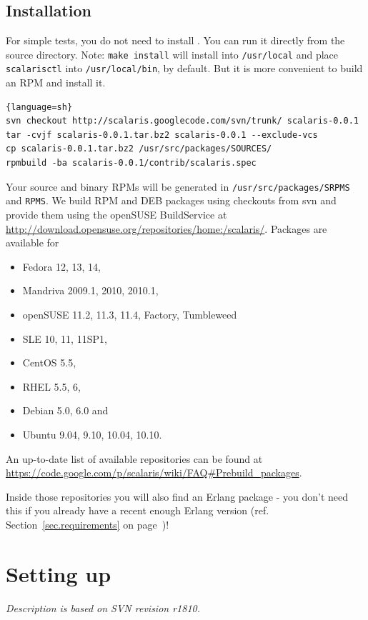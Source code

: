 \documentclass[a4paper]{scrreprt}
\newcommand{\sieheref}[1]{\ref{#1} on page~\pageref{#1}}
\newcommand{\code}[1]{\lstinline[basicstyle=\ttfamily]!#1!}
\newcommand{\svnrev}[1]
{\hfill\emph{Description is based on SVN revision #1.}\medskip}
\begin{document}
\section{Installation}
\label{sec:install}

For simple tests, you do not need to install \scalaris{}. You can run it
directly from the source directory. Note: \code{make install} will install
\scalaris{} into \code{/usr/local} and place \code{scalarisctl} into
\code{/usr/local/bin}, by default. But it is more convenient to build an RPM
and install it.

\begin{lstlisting}{language=sh}
svn checkout http://scalaris.googlecode.com/svn/trunk/ scalaris-0.0.1
tar -cvjf scalaris-0.0.1.tar.bz2 scalaris-0.0.1 --exclude-vcs
cp scalaris-0.0.1.tar.bz2 /usr/src/packages/SOURCES/
rpmbuild -ba scalaris-0.0.1/contrib/scalaris.spec
\end{lstlisting}

Your source and binary RPMs will be generated in
\code{/usr/src/packages/SRPMS} and \code{RPMS}. We build RPM and DEB packages
using checkouts from svn and provide them using the openSUSE BuildService at
\url{http://download.opensuse.org/repositories/home:/scalaris/}. Packages
are available for

\begin{itemize}
\item Fedora 12, 13, 14,
\item Mandriva 2009.1, 2010, 2010.1,
\item openSUSE 11.2, 11.3, 11.4, Factory, Tumbleweed
\item SLE 10, 11, 11SP1,
\item CentOS 5.5,
\item RHEL 5.5, 6,
\item Debian 5.0, 6.0 and
\item Ubuntu 9.04, 9.10, 10.04, 10.10.
\end{itemize}

An up-to-date list of available repositories can be found at
\url{https://code.google.com/p/scalaris/wiki/FAQ#Prebuild_packages}.

Inside those repositories you will also find an Erlang package - you don't
need this if you already have a recent enough Erlang version
(ref. Section~\sieheref{sec.requirements})!


\chapter{Setting up \scalaris{}}
\label{chapter.runscalaris}
\svnrev{r1810}
\end{document}
